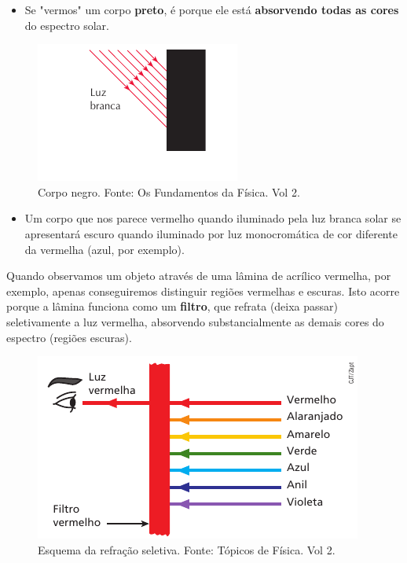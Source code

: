 \documentclass[11pt,twocolumn,oneside]{article}
\begin{document}
\begin{itemize}

\item Se "vermos" um corpo \textbf{preto}, é porque ele está \textbf{absorvendo todas as cores} do espectro solar.

\end{itemize}


\begin{figure}[h]{}
\centering\includegraphics[width=2.5truein]{img12.png}
\caption{Corpo negro. Fonte: Os Fundamentos da Física. Vol 2.}
\centering
\end{figure}

\begin{itemize}

\item Um corpo que nos parece vermelho quando iluminado pela luz branca solar se apresentará escuro quando iluminado por luz monocromática de cor diferente da vermelha (azul, por exemplo).

\end{itemize}


Quando observamos um objeto através de uma lâmina de acrílico vermelha, por exemplo, apenas conseguiremos distinguir regiões vermelhas e escuras. Isto acorre porque a lâmina funciona como um \textbf{filtro}, que refrata (deixa passar) seletivamente a luz vermelha, absorvendo substancialmente as demais cores do espectro (regiões escuras).


\begin{figure}[h]{}
\centering\includegraphics[width=2.5truein]{img13.png}
\caption{Esquema da refração seletiva. Fonte: Tópicos de Física. Vol 2.}
\centering
\end{figure}
\end{document}
